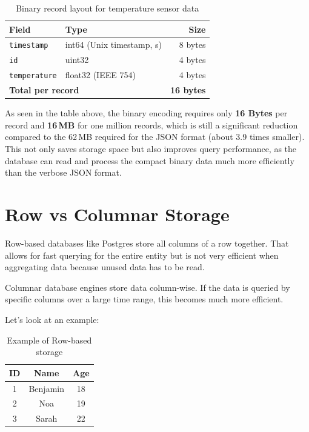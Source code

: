 \begin{table}[ht]
  \centering
  \begin{tabular}{llr}
    \toprule
    \textbf{Field}                                & \textbf{Type}             & \textbf{Size} \\
    \midrule
    \texttt{timestamp}                            & int64 (Unix timestamp, s) & 8 bytes       \\
    \texttt{id}                                   & uint32                    & 4 bytes       \\
    \texttt{temperature}                          & float32 (IEEE 754)        & 4 bytes       \\
    \midrule
    \multicolumn{2}{l}{\textbf{Total per record}} & \textbf{16 bytes}                         \\
    \bottomrule
  \end{tabular}
  \caption{Binary record layout for temperature sensor data}
\end{table}

As seen in the table above, the binary encoding requires only \textbf{16 Bytes}
per record and \textbf{16\,MB} for one million records, which is still a
significant reduction compared to the 62\,MB required for the JSON format
(about 3.9 times smaller). This not only saves storage space but also improves
query performance, as the database can read and process the compact binary data
much more efficiently than the verbose JSON format.

\section{Row vs Columnar Storage}

Row-based databases like Postgres store all columns of a row together. That
allows for fast querying for the entire entity but is not very efficient when
aggregating data because unused data has to be read.

Columnar database engines store data column-wise. If the data is queried by
specific columns over a large time range, this becomes much more efficient.

Let's look at an example:

\begin{table}[ht]
  \centering
  \begin{tabular}{ccc}
    \toprule
    ID & Name     & Age \\
    \midrule
    1  & Benjamin & 18  \\
    2  & Noa      & 19  \\
    3  & Sarah    & 22  \\
    \bottomrule
  \end{tabular}
  \caption{Example of Row-based storage}
\end{table}

